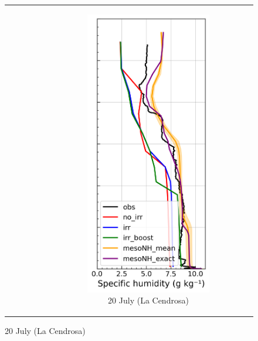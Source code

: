 \begin{figure}[hbtp]
{\begin{tabular}{@{}cccc@{}}
\begin{subfigure}[t]{0.382\textwidth}
        \end{subfigure} &
        \begin{subfigure}[t]{0.289\textwidth}
            \caption{20 July (La Cendrosa)}
            \includegraphics[width=\textwidth]{images/chap5/profiles/profile_cendrosa_ovap_2007_.png}

\end{subfigure}
\end{tabular}}
\end{figure}
